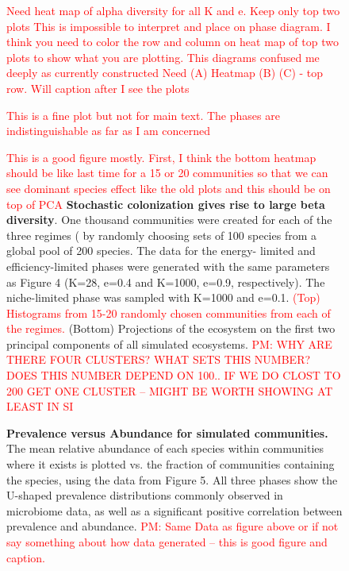 \documentclass[aps,amsmath,graphix,amssymb,longbibliography]{revtex4-1}
\newcommand\0{\scalebox{-1}[1]{0}}
\newcommand*{\red}{\textcolor{red}}
\begin{document}
\begin{figure}
\caption{ \red{Need heat map of alpha diversity for all K and e. Keep only top two plots This is impossible to interpret and place on phase diagram. I think you need to color the row and column on heat map of top two plots to show what you are plotting. This diagrams confused me deeply as currently  constructed}  \red{Need (A) Heatmap (B) (C) - top row. Will caption after I see the plots}}
\end{figure}

\begin{figure}
\caption{ \red{This is a fine plot but not for main text. The phases are indistinguishable as far as I am concerned}}
\end{figure}

\begin{figure}
\caption{\red{This is a good figure mostly. First, I think the bottom heatmap should be like last time for a 15 or 20 communities so that we can see dominant species effect like the old plots  and this should be on top of PCA}
{\bf Stochastic colonization gives rise to large beta diversity}.  One thousand communities were created for each of the three regimes ( by randomly choosing sets of 100 species from a global 
pool of 200 species. The data for the energy- limited and efficiency-limited phases were  generated with the same parameters as Figure 4 (K=28, e=0.4 and K=1000, e=0.9, respectively). The niche-limited phase was sampled with 
K=1000 and e=0.1. \red{(Top) Histograms from 15-20 randomly chosen communities from each of the regimes.} (Bottom) Projections of the ecosystem on the first two principal components of all simulated ecosystems.  \red{PM: WHY ARE THERE FOUR CLUSTERS? WHAT SETS THIS NUMBER? DOES THIS NUMBER DEPEND ON 100.. IF WE DO
CLOST TO 200 GET ONE CLUSTER -- MIGHT BE WORTH SHOWING AT LEAST IN SI} }
\end{figure}

\begin{figure}
\caption{ {\bf Prevalence versus Abundance for simulated communities.} The mean relative abundance of each species within communities where it exists is plotted vs. the fraction of communities containing the species, using the data from Figure 5. All three phases show the U-shaped prevalence distributions commonly observed in microbiome data, as well as a significant positive correlation between prevalence and abundance. \red{PM: Same Data as figure above or if not say something about how data generated -- this is good figure and caption.}}
\end{figure}
\end{document}
